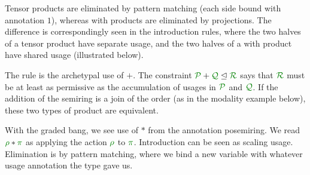 \documentclass[a4paper]{easychair}
\begin{document}

Tensor products are eliminated by pattern matching (each side bound with
annotation $1$), whereas with products are eliminated by projections.
The difference is correspondingly seen in the introduction rules, where the two
halves of a tensor product have separate usage, and the two halves of a with
product have shared usage (illustrated below).

The rule  is the archetypal use of $+$.
The constraint $\subrctx{\resctx P + \resctx Q}{\resctx R}$ says that $\resctx
R$ must be at least as permissive as the accumulation of usages in $\resctx P$
and $\resctx Q$.
If the addition of the semiring is a join of the order (as in the modality
example below), these two types of product are equivalent.


With the graded bang, we see use of $*$ from the annotation posemiring.
We read $\rescomment \rho * \rescomment \pi$ as applying the action $\rescomment
\rho$ to $\rescomment \pi$.
Introduction can be seen as scaling usage.
Elimination is by pattern matching, where we bind a new variable with whatever
usage annotation the type gave us.

\end{document}
